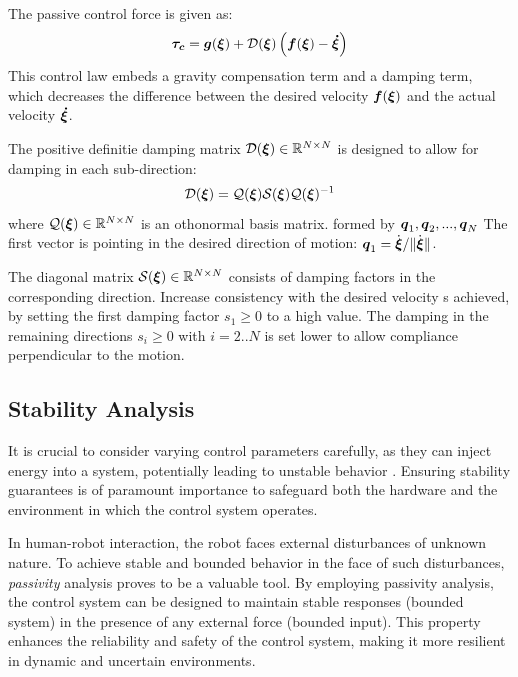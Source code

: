 The passive control force \cite{kronander2015passive} is given as:
\begin{equation}
	\vecs{\tau_c} = \vect g (\vecs\xi) 
	+ \matd{D}(\vecs\xi) \left(\vecs f(\vecs\xi) - \vecs{\dot\xi} \right) 
\label{eq:control_command}
\end{equation}
This control law embeds a gravity compensation term and a damping term, which decreases the difference between the desired velocity $\boldsymbol{f}(\boldsymbol{\xi})$ and the actual velocity $\boldsymbol{\dot\xi}$.

The positive definitie damping matrix $\mathcal{D}(\boldsymbol{\xi}) \in \mathbb{R}^{N \times N}$ is designed to allow for damping in each sub-direction:
\begin{equation}
   \matd {D}(\vecs \xi) = \matd{Q}(\vecs\xi)\matd{S}(\vecs\xi) \matd{Q} (\vecs \xi)^{-1}
\label{eq:damping_matrix}
\end{equation}
where $\mathcal{Q}(\boldsymbol{\xi}) \in \mathbb{R}^{N \times N}$ is an othonormal basis matrix. 
formed by $\boldsymbol{q}_1, \boldsymbol{q}_2, ..., \boldsymbol{q}_N$ The first vector is pointing in the desired direction of motion: $\boldsymbol{q}_1 = \dot{\boldsymbol{\xi}} / \lVert \dot{\boldsymbol{\xi}} \rVert$.

The diagonal matrix $\mathcal{S}(\boldsymbol{\xi}) \in \mathbb{R}^{N \times N}$ consists of damping factors in the corresponding direction.
Increase consistency with the desired velocity s achieved, by setting the first damping factor $s_1 \geq 0$ to a high value. The damping in the remaining directions $s_i \geq 0$ with $i = 2 .. N$ is set lower to allow compliance perpendicular to the motion. 

\subsection{Stability Analysis} \label{sec:trad_passive}
It is crucial to consider varying control parameters carefully, as they can inject energy into a system, potentially leading to unstable behavior \cite{ferraguti2013tank}. Ensuring stability guarantees is of paramount importance to safeguard both the hardware and the environment in which the control system operates.

In human-robot interaction, the robot faces external disturbances of unknown nature. To achieve stable and bounded behavior in the face of such disturbances, \textit{passivity} analysis proves to be a valuable tool. By employing passivity analysis, the control system can be designed to maintain stable responses (bounded system) in the presence of any external force (bounded input). This property enhances the reliability and safety of the control system, making it more resilient in dynamic and uncertain environments.

